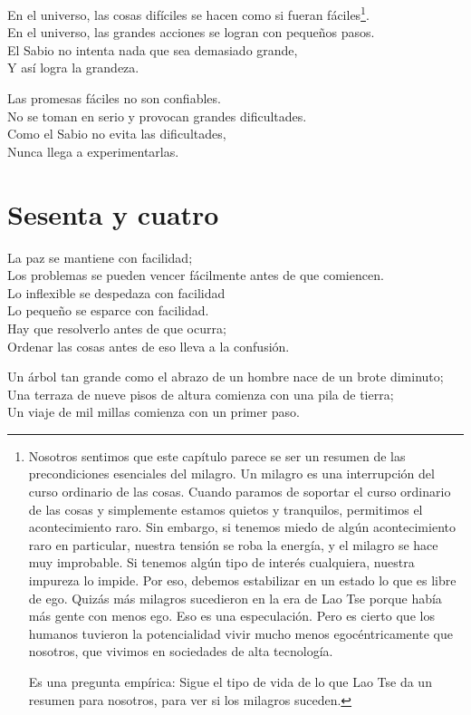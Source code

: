 \documentclass[hidelinks]{memoir}
\begin{document}
	En el universo, las cosas difíciles se hacen como si fueran fáciles\footnote{Nosotros sentimos que este capítulo parece se ser un resumen de las
		precondiciones esenciales del milagro. Un milagro es una interrupción
		del curso ordinario de las cosas. Cuando paramos de soportar el curso
		ordinario de las cosas y simplemente estamos quietos y tranquilos,
		permitimos el acontecimiento raro. Sin embargo, si tenemos miedo de
		algún acontecimiento raro en particular, nuestra tensión se roba la
		energía, y el milagro se hace muy improbable. Si tenemos algún tipo de
		interés cualquiera, nuestra impureza lo impide. Por eso, debemos
		estabilizar en un estado lo que es libre de ego. Quizás más milagros
		sucedieron en la era de Lao Tse porque había más gente con menos ego.
		Eso es una especulación. Pero es cierto que los humanos tuvieron la
		potencialidad vivir mucho menos egocéntricamente que nosotros, que
		vivimos en sociedades de alta tecnología.

Es una pregunta empírica: Sigue el tipo de vida de lo que Lao Tse da un
resumen para nosotros, para ver si los milagros suceden.	
}.\\
	En el universo, las grandes acciones se logran con pequeños pasos.\\
	El Sabio no intenta nada que sea demasiado grande,\\
	Y así logra la grandeza.
	
	Las promesas fáciles no son confiables.\\
	No se toman en serio y provocan grandes dificultades.\\
	Como el Sabio no evita las dificultades,\\
	Nunca llega a experimentarlas.
	
	\chapter*{Sesenta y cuatro}
	
	La paz se mantiene con facilidad;\\
	Los problemas se pueden vencer fácilmente antes de que comiencen.\\
	Lo inflexible se despedaza con facilidad\\
	Lo pequeño se esparce con facilidad.\\
	Hay que resolverlo antes de que ocurra;\\
	Ordenar las cosas antes de eso lleva a la confusión.
	
	Un árbol tan grande como el abrazo de un hombre nace de un brote
	diminuto;\\
	Una terraza de nueve pisos de altura comienza con una pila de tierra;\\
	Un viaje de mil millas comienza con un primer paso.
	
\end{document}
